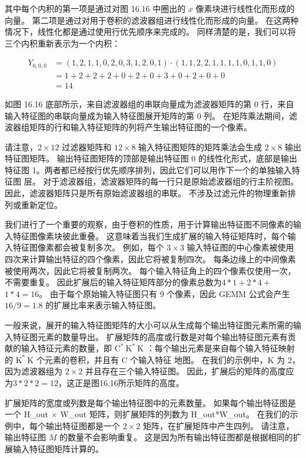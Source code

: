 其中每个内积的第一项是通过对图 16.16 中圈出的 $x$ 像素块进行线性化而形成的向量。 第二项是通过对用于卷积的滤波器组进行线性化而形成的向量。 在这两种情况下，线性化都是通过使用行优先顺序来完成的。 同样清楚的是，我们可以将三个内积重新表示为一个内积：

$$
\begin{aligned}
Y_{0,0,0} & =(1,2,1,1,0,2,0,3,1,2,0,1) \cdot(1,1,2,2,1,1, 1,1,0,1,1,0) \\
& =1+2+2+2+0+2+0+3+0+2+0+0 \\
&=14
\end{aligned}
$$

如图 16.16 底部所示，来自滤波器组的串联向量成为滤波器矩阵的第 0 行，来自输入特征图的串联向量成为输入特征图展开矩阵的第 0 列。 在矩阵乘法期间，滤波器组矩阵的行和输入特征矩阵的列将产生输出特征图的一个像素。

请注意，$2 \times 12$ 过滤器矩阵和 $12 \times 8$ 输入特征图矩阵的矩阵乘法会生成 $2 \times 8$ 输出特征图矩阵。 输出特征图矩阵的顶部是输出特征图 0 的线性化形式，底部是输出特征图 1。两者都已经按行优先顺序排列，因此它们可以用作下一个的单独输入特征图 层。 对于滤波器组，滤波器矩阵的每一行只是原始滤波器组的行主阶视图。 因此，滤波器矩阵只是所有原始滤波器组的串联。 不涉及过滤元件的物理重新排列或重新定位。

我们进行了一个重要的观察，由于卷积的性质，用于计算输出特征图不同像素的输入特征图像素块彼此重叠。 这意味着当我们生成扩展的输入特征矩阵时，每个输入特征图像素都会被复制多次。 例如，每个 $3 \times 3$ 输入特征图的中心像素被使用四次来计算输出特征的四个像素，因此它将被复制四次。 每条边缘上的中间像素被使用两次，因此它将被复制两次。 每个输入特征角上的四个像素仅使用一次，不需要重复。 因此扩展后的输入特征矩阵部分的像素总数为$4 * 1+2 * 4+$ $1 * 4=16$。 由于每个原始输入特征图只有 9 个像素，因此 GEMM 公式会产生 $16 / 9=1.8$ 的扩展比率来表示输入特征图。

一般来说，展开的输入特征图矩阵的大小可以从生成每个输出特征图元素所需的输入特征图元素的数量导出。 扩展矩阵的高度或行数是对每个输出特征图元素有贡献的输入特征元素的数量，即 $\mathrm{C}^{*} \mathrm{~K}^{*} \mathrm{~K}$ ：每个输出元素是来自每个输入特征映射的 $\mathrm{K}^{*} \mathrm{~K}$ 个元素的卷积，并且有 $\mathrm{C}$ 个输入特征 地图。 在我们的示例中，$\mathrm{K}$ 为 2，因为滤波器组为 $2 \times 2$ 并且存在三个输入特征图。 因此，扩展后的矩阵的高度应为$3 * 2 * 2=12$，这正是图16.16所示矩阵的高度。

扩展矩阵的宽度或列数是每个输出特征图中的元素数量。 如果每个输出特征图是一个 H\_out $\times$ W\_out 矩阵，则扩展矩阵的列数为 H\_out*W\_out。 在我们的示例中，每个输出特征图都是一个 $2 \times 2$ 矩阵，在扩展矩阵中产生四列。 请注意，输出特征图 $M$ 的数量不会影响重复。 这是因为所有输出特征图都是根据相同的扩展输入特征图矩阵计算的。

